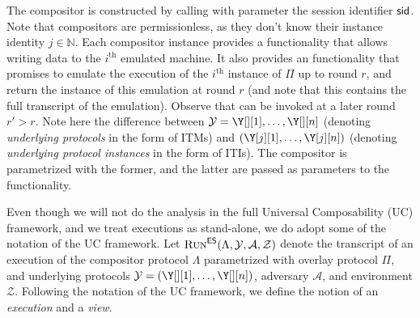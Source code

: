 The compositor is constructed by calling \emph{\construct} with parameter the session identifier $\textsf{sid}$.
Note that compositors are permissionless, as they don't know their instance identity $j \in \mathbb{N}$.
Each compositor instance provides a \emph{\writeToMachine}
functionality that allows writing data to the $i^\text{th}$ emulated machine.
It also provides an \emph{\emulationSnapshot} functionality that promises to emulate the execution of
the $i^\text{th}$ instance of $\Pi$ up to round $r$, and return the instance of this emulation
at round $r$ (and note that this contains the full transcript of the emulation).
Observe that \emph{\emulationSnapshot} can be invoked at a later round $r' > r$.
Note here the difference between $\mathcal{Y} = \Y[][1], \ldots, \Y[][n]$ (denoting \emph{underlying protocols}
in the form of ITMs) and
$(\Y[j][1], \ldots, \Y[j][n])$ (denoting \emph{underlying protocol instances}
in the form of ITIs). The compositor is parametrized with the former, and
the latter are passed as parameters to the \emph{\construct} functionality.

Even though we will not do the analysis in the full Universal Composability (UC) framework, and
we treat executions as stand-alone, we do adopt some of the notation of the UC framework.
Let $\textsc{Run}^{\textsf{ES}}(\Lambda, \mathcal{Y}, \mathcal{A}, \mathcal{Z})$
denote the transcript of an execution of the compositor protocol $\Lambda$ parametrized with overlay protocol $\Pi$,
and underlying protocols $\mathcal{Y} = (\Y[][1], \ldots, \Y[][n])$, adversary $\mathcal{A}$, and environment $\mathcal{Z}$.
Following the notation of the UC framework, we define the notion of an \emph{execution}
and a \emph{view}.

